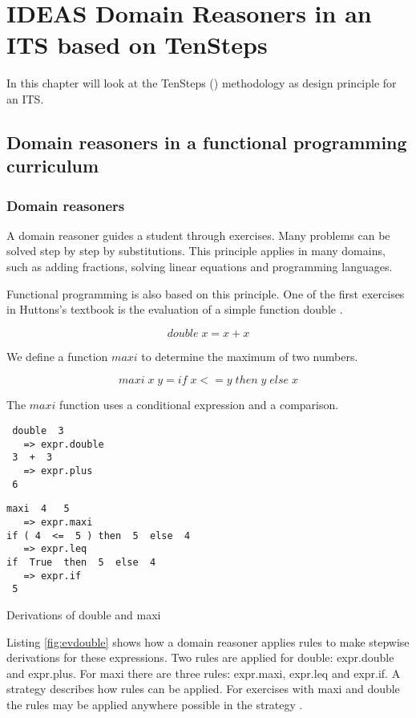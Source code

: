 \chapter{IDEAS Domain Reasoners in an ITS based on TenSteps}

In this chapter will look at the  TenSteps (\cite{kirschner_2013})  methodology as design principle for an ITS.


\section{Domain reasoners in a functional programming curriculum}

\subsection{Domain reasoners}
\label{sec:drmaxidble}
A domain reasoner guides a student through exercises.
Many problems  can be solved step by step by substitutions.
This principle applies in many domains, such as adding fractions, solving linear equations and programming languages.

Functional programming is also based on this principle.
One of the first exercises in Huttons's textbook is the evaluation of a simple function double  \citep{hutton_2016}.

\begin{equation}
\mathit{double} \; x = x + x
\end{equation}

We define a function $maxi$ to determine the maximum of two numbers.

\begin{equation}
\mathit{maxi} \; x \; y = \mathit{if} \; x <= y \;  \mathit{then}\;  y \; \mathit{else} \; x
\end{equation}

The $maxi$ function uses a conditional expression and a comparison.

\begin{Listing}
\begin{minipage}[t]{7cm}
\begin{verbatim}
 double  3 
   => expr.double
 3  +  3 
   => expr.plus
 6 
\end{verbatim}
\end{minipage}
\begin{minipage}[t]{7cm}
\begin{verbatim}
maxi  4   5 
   => expr.maxi
if ( 4  <=  5 ) then  5  else  4 
   => expr.leq
if  True  then  5  else  4 
   => expr.if
 5 
\end{verbatim}
\end{minipage}
\caption{Derivations of double and maxi}\label{fig:evdouble}
\end{Listing}
Listing \ref{fig:evdouble} shows how a domain reasoner applies rules to make  stepwise derivations for these expressions.
Two rules are applied for double: expr.double and expr.plus. For maxi there are three rules:   expr.maxi, expr.leq and expr.if.
A strategy describes how rules can be applied. 
For exercises with maxi and double the rules may be applied anywhere possible in the strategy .

